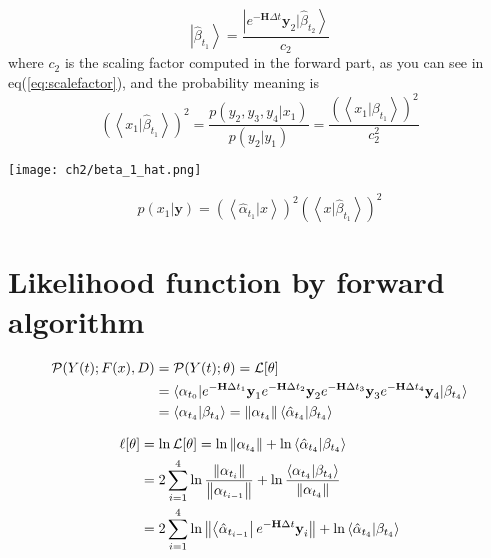 \begin{definition}
\begin{equation}
        \left|\hat{\beta}_{t_1}  \right> =  \frac{\left| e^{-\textbf{H}\Delta t} \textbf{y}_2 |\hat{\beta}_{t_2} \right>}{c_2}
\end{equation}
where $c_2$ is the scaling factor computed in the forward part, as you can see in eq(\ref{eq:scalefactor}), and 
the probability meaning is
\begin{equation}
        \left(\left<x_1|\hat{\beta}_{t_1} \right>\right)^2 = \frac{p(y_2, y_3, y_4|x_1)}{p(y_2|y_1)} 
        =  \frac{ (\left<x_1|\beta_{t_1} \right>)^2 }{ c_2^2 }
\end{equation}
\begin{center}
        \texttt{[image: ch2/beta\_1\_hat.png]}
\end{center}
\begin{equation}
        p(x_1|\textbf{y}) = (\left<\hat{\alpha}_{t_{1}}|x \right>)^2 \left(\left<x|\hat{\beta}_{t_{1}} \right>\right)^2
\end{equation} 
\end{definition}

\section{Likelihood function by forward algorithm}
\begin{definition}
\begin{align*}
        \mathcal{P}(Y(t) ; F(x),D) &= \mathcal{P}(Y(t) ; \theta)= \mathcal{L}[\theta] \\
	&= \langle \alpha_{t_0} |e^{-\textbf{H}\Delta t_1}\textbf{y}_1e^{-\textbf{H}\Delta t_2}\textbf{y}_2 e^{-\textbf{H}\Delta t_{3}}\textbf{y}_{3} e^{-\textbf{H}\Delta t_{4}}\textbf{y}_{4} | \beta_{t_{4}} \rangle \\
	&=  \left < \alpha_{t_{4}} | \beta_{t_{4}} \right > = \left\lVert\alpha_{t_{4}}\right\rVert \left < \hat{\alpha}_{t_{4}} | \beta_{t_{4}} \right > 
\end{align*}
\end{definition}

\begin{definition}
\begin{align*}
        \ell[\theta] &= \ln \mathcal{L}[\theta] = \ln{\left\lVert\alpha_{t_{4}}\right\rVert} + \ln{\left < \hat{\alpha}_{t_{4}} | \beta_{t_{4}} \right >} \\  
        & =2 \sum_{i=1}^{4} \ln{\frac{\left\lVert\alpha_{t_{i}}\right\rVert}{\left\lVert\alpha_{t_{i-1}}\right\rVert}} + \ln{\frac{ \left < \alpha_{t_{4}} | \beta_{t_{4}}\right>}{\left\lVert\alpha_{t_{4}}\right\rVert}} \\ 
        & = 2 \sum_{i=1}^{4} \ln{\left\lVert\left< \hat{\alpha}_{t_{i-1}} \right| e^{-\textbf{H}\Delta t} \textbf{y}_i\right\rVert} + \ln{\left < \hat{\alpha}_{t_{4}} | \beta_{t_{4}} \right >} 
\end{align*}
\end{definition}

